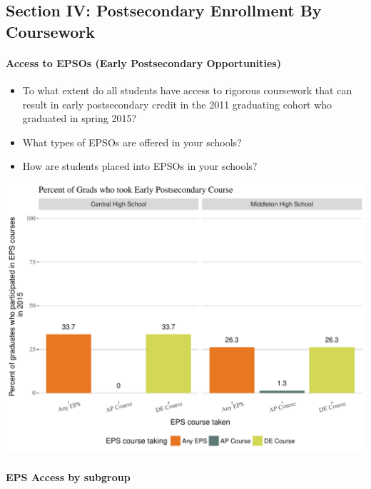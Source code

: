 \documentclass[11pt,]{article}
\providecommand{\tightlist}{%
  \setlength{\itemsep}{0pt}\setlength{\parskip}{0pt}}
\let\oldparagraph\paragraph
\renewcommand{\paragraph}[1]{\oldparagraph{#1}\mbox{}}
\begin{document}
\newpage

\subsection{Section IV: Postsecondary Enrollment By
Coursework}\label{section-iv-postsecondary-enrollment-by-coursework}

\paragraph{Access to EPSOs (Early Postsecondary
Opportunities)}\label{access-to-epsos-early-postsecondary-opportunities}

\begin{itemize}
\tightlist
\item
  To what extent do all students have access to rigorous coursework that
  can result in early postsecondary credit in the 2011 graduating cohort
  who graduated in spring 2015?
\item
  What types of EPSOs are offered in your schools?
\item
  How are students placed into EPSOs in your schools?
\end{itemize}

\includegraphics{20170419_PSWRR_files/figure-latex/Figure9a-1.pdf}

\newpage 

\paragraph{EPS Access by subgroup}\label{eps-access-by-subgroup}
\end{document}
